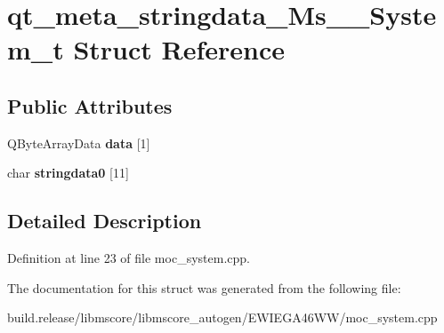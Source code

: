 \hypertarget{structqt__meta__stringdata___ms_____system__t}{}\section{qt\+\_\+meta\+\_\+stringdata\+\_\+\+Ms\+\_\+\+\_\+\+System\+\_\+t Struct Reference}
\label{structqt__meta__stringdata___ms_____system__t}
\subsection*{Public Attributes}
\begin{DoxyCompactItemize}
\item 
\mbox{\label{structqt__meta__stringdata___ms_____system__t_af16272ec7c19dc919394eef5fb900de4}} 
Q\+Byte\+Array\+Data {\bfseries data} \mbox{[}1\mbox{]}
\item 
\mbox{\label{structqt__meta__stringdata___ms_____system__t_ae43d15aba0f427546f9f3710d2cf252f}} 
char {\bfseries stringdata0} \mbox{[}11\mbox{]}
\end{DoxyCompactItemize}


\subsection{Detailed Description}


Definition at line 23 of file moc\+\_\+system.\+cpp.



The documentation for this struct was generated from the following file\+:\begin{DoxyCompactItemize}
\item 
build.\+release/libmscore/libmscore\+\_\+autogen/\+E\+W\+I\+E\+G\+A46\+W\+W/moc\+\_\+system.\+cpp\end{DoxyCompactItemize}
